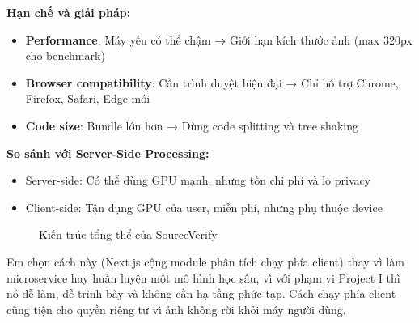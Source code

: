 \textbf{Hạn chế và giải pháp:}
\begin{itemize}
  \item \textbf{Performance}: Máy yếu có thể chậm → Giới hạn kích thước ảnh (max 320px cho benchmark)
  \item \textbf{Browser compatibility}: Cần trình duyệt hiện đại → Chỉ hỗ trợ Chrome, Firefox, Safari, Edge mới
  \item \textbf{Code size}: Bundle lớn hơn → Dùng code splitting và tree shaking
\end{itemize}

\textbf{So sánh với Server-Side Processing:}
\begin{itemize}
  \item Server-side: Có thể dùng GPU mạnh, nhưng tốn chi phí và lo privacy
  \item Client-side: Tận dụng GPU của user, miễn phí, nhưng phụ thuộc device
\end{itemize}

\begin{figure}[H]
\centering
{}
\caption{Kiến trúc tổng thể của SourceVerify}
\label{fig:system-architecture}
\end{figure}

Em chọn cách này (Next.js cộng module phân tích chạy phía client) thay vì làm microservice hay huấn luyện một mô hình học sâu, vì với phạm vi Project I thì nó dễ làm, dễ trình bày và không cần hạ tầng phức tạp. Cách chạy phía client cũng tiện cho quyền riêng tư vì ảnh không rời khỏi máy người dùng.

